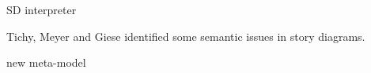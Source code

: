 SD interpreter \cite{GHS09}

Tichy, Meyer and Giese \cite{TMG06} identified some semantic issues in story diagrams.









new meta-model \cite{HRvD+11}
